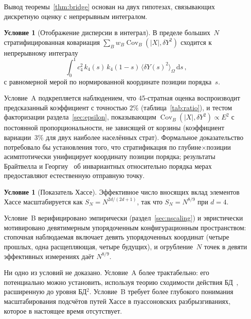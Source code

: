 \documentclass[12pt,a4paper]{article}
\theoremstyle{plain}
\theoremstyle{definition}
\newtheorem{condition}[theorem]{Условие}
\theoremstyle{remark}
\newcommand{\dd}{\mathrm{d}}
\newcommand{\Cov}{\operatorname{Cov}}
\begin{document}
Вывод теоремы~\ref{thm:bridge} основан на двух гипотезах,
связывающих дискретную оценку с непрерывным интегралом.

\begin{condition}[Отображение дисперсии в интеграл]
\label{cond:A}
В пределе больших~$N$ стратифицированная ковариация
$\sum_B w_B \Cov_B(|X|, \delta Y^2)$ сходится к
непрерывному интегралу
\begin{equation}\label{eq:condA}
  \int_0^1 c_4^2\, k_4(s)\, k_4(1-s)\,
  \langle \delta Y(s)^2 \rangle_\Omega\, \dd s\,,
\end{equation}
с равномерной мерой по нормированной координате
позиции порядка~$s$.
\end{condition}

Условие~A подкрепляется наблюдением, что 45-стратная
оценка воспроизводит предсказанный коэффициент с точностью
$2\%$ (таблица~\ref{tab:ratio}), и тестом факторизации
раздела~\ref{sec:epsilon}, показывающим
$\Cov_B(|X|, \delta Y^2) \propto E^2$ с постоянной
пропорциональности, не зависящей от корзины (коэффициент
вариации~$3\%$ для двух наиболее населённых страт).
Формальное доказательство потребовало бы установления того,
что стратификация по глубине$\times$позиции асимптотически
унифицирует координату позиции порядка; результаты Брайтвелла
и Георгиу~\cite{BrightwellLuczak:2011} об инвариантных
относительно порядка мерах предоставляют естественную
отправную точку.

\begin{condition}[Показатель Хассе]
\label{cond:B}
Эффективное число вносящих вклад элементов Хассе
масштабируется как
$S_N = N^{2d/(2d+1)}$, так что $S_N = N^{8/9}$ при $d = 4$.
\end{condition}

Условие~B верифицировано эмпирически
(раздел~\ref{sec:nscaling}) и эвристически мотивировано
девятимерным упорядоченным конфигурационным пространством:
стопочная наблюдаемая включает девять упорядоченных координат
(четыре прошлых, одна расщепляющая, четыре будущих), и
огрубление~$N$ точек в девяти эффективных измерениях даёт
$N^{8/9}$.

Ни одно из условий не доказано.  Условие~A более
трактабельно: его потенциально можно установить, используя
теорию сходимости действия БД~\cite{BenincasaDowker:2010},
расширенную до уровня БД${}^2$.  Условие~B требует более
глубокого понимания масштабирования подсчётов путей Хассе в
пуассоновских разбрызгиваниях, которое в настоящее время
отсутствует.

\end{document}
